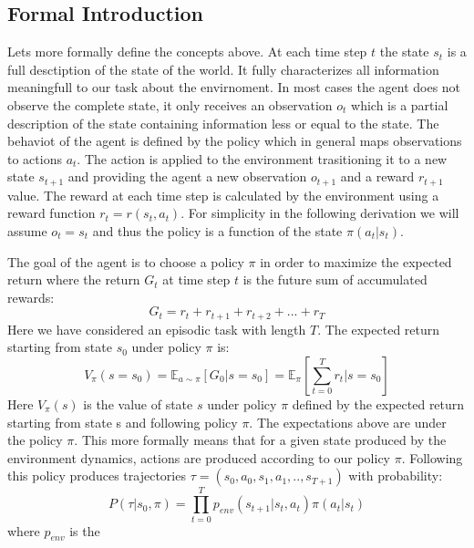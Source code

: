 \documentclass{article}
\begin{document}
\subsection{Formal Introduction}
Lets more formally define the concepts above.
At each time step $t$ the state $s_t$ is a full desctiption of the state of the world. It fully characterizes all information meaningfull to our task about the envirnoment. In most cases the agent does not observe the complete state, it only receives an observation $o_t$ which is a partial description of the state containing information less or equal to the state. The behaviot of the agent is defined by the policy which in general maps observations to actions $a_t$. The action is applied to the environment trasitioning it to a new state $s_{t+1}$ and providing the agent a new observation $o_{t+1}$ and a reward $r_{t+1}$ value. The reward at each time step is calculated by the environment using a reward function $r_t=r(s_t,a_t)$. For simplicity in the following derivation we will assume $o_t=s_t$ and thus the policy is a function of the state $\pi(a_t|s_t)$.

The goal of the agent is to choose a policy $\pi$ in order to maximize the expected return where the return $G_t$ at time step $t$ is the future sum of accumulated rewards:
\begin{equation}
G_t= r_t+r_{t+1}+r_{t+2}+...+r_T
\end{equation}
Here we have considered an episodic task with length $T$. The expected return starting from state $s_0$ under policy $\pi$ is:
\begin{equation}
V_\pi(s=s_0)= \mathbb{E}_{a \sim \pi}[G_0|s=s_0] = \mathbb{E}_\pi[\sum_{t=0}^Tr_t|s=s_0]
\end{equation}
Here $V_\pi(s)$ is the value of state $s$ under policy $\pi$ defined by the expected return starting from state s and following policy $\pi$.
The expectations above are under the policy $\pi$. This more formally means that for a given state produced by the environment dynamics, actions are produced according to our policy $\pi$. Following this policy produces trajectories $\tau= (s_0,a_0,s_1,a_1,..,s_{T+1})$ with probability:
\begin{equation}
P(\tau|s_0,\pi) =\prod_{t=0}^Tp_{env}(s_{t+1}|s_t,a_t)\pi(a_t|s_t)
\end{equation}
where $p_{env}$ is the 
\end{document}
